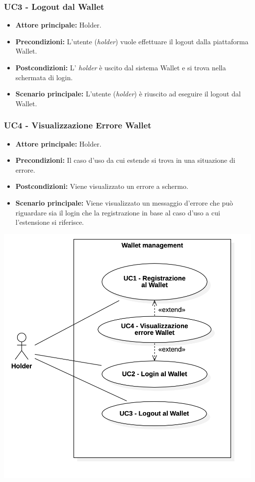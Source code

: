 \subsubsection{UC3 - Logout dal Wallet}
\begin{itemize}
\item \textbf{Attore principale:} Holder.
\item \textbf{Precondizioni:} L'utente (\textit{holder}) vuole effettuare il logout dalla piattaforma Wallet.
\item \textbf{Postcondizioni:} L' \textit{holder} è uscito dal sistema Wallet e si trova nella schermata di login.
\item \textbf{Scenario principale:} L'utente (\textit{holder}) è riuscito ad eseguire il logout dal Wallet. 
\end{itemize}

\subsubsection{UC4 - Visualizzazione Errore Wallet}
\begin{itemize}
\item \textbf{Attore principale:} Holder.
\item \textbf{Precondizioni:} Il caso d'uso da cui estende si trova in una situazione di errore.
\item \textbf{Postcondizioni:} Viene visualizzato un errore a schermo. 
\item \textbf{Scenario principale:} Viene visualizzato un messaggio d’errore che può riguardare sia il login che la registrazione in base al caso d’uso a cui l’estensione si riferisce.
\end{itemize}

\begin{center}
  \includegraphics[scale = 0.38]{./res/img/1Wallet_management.png}
\end{center}

